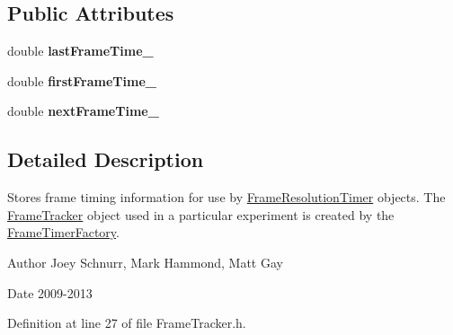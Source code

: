 \subsection*{Public Attributes}
\begin{DoxyCompactItemize}
\item 
\hypertarget{struct_picto_1_1_controller_1_1_frame_tracker_a872a8e71dc8974d25c2b758c6714c9c9}{double {\bfseries last\-Frame\-Time\-\_\-}}\label{struct_picto_1_1_controller_1_1_frame_tracker_a872a8e71dc8974d25c2b758c6714c9c9}

\item 
\hypertarget{struct_picto_1_1_controller_1_1_frame_tracker_abf3f47840c7b6196799b1f5ab1287035}{double {\bfseries first\-Frame\-Time\-\_\-}}\label{struct_picto_1_1_controller_1_1_frame_tracker_abf3f47840c7b6196799b1f5ab1287035}

\item 
\hypertarget{struct_picto_1_1_controller_1_1_frame_tracker_a05742eac8454a7e95b83a3bd2680938c}{double {\bfseries next\-Frame\-Time\-\_\-}}\label{struct_picto_1_1_controller_1_1_frame_tracker_a05742eac8454a7e95b83a3bd2680938c}

\end{DoxyCompactItemize}


\subsection{Detailed Description}
Stores frame timing information for use by \hyperlink{class_picto_1_1_controller_1_1_frame_resolution_timer}{Frame\-Resolution\-Timer} objects. The \hyperlink{struct_picto_1_1_controller_1_1_frame_tracker}{Frame\-Tracker} object used in a particular experiment is created by the \hyperlink{class_picto_1_1_controller_1_1_frame_timer_factory}{Frame\-Timer\-Factory}. 

\begin{DoxyAuthor}{Author}
Joey Schnurr, Mark Hammond, Matt Gay 
\end{DoxyAuthor}
\begin{DoxyDate}{Date}
2009-\/2013 
\end{DoxyDate}


Definition at line 27 of file Frame\-Tracker.\-h.



